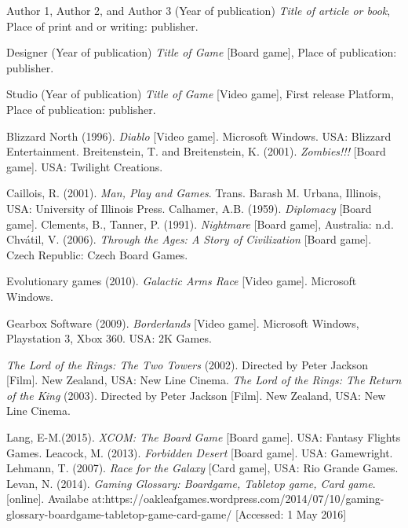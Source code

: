 \documentclass[a4paper,11pt]{article}
\begin{document}
\pagebreak
%
\begin{thebibliography}{1}

Author 1, Author 2, and Author 3 (Year of publication) \emph{Title of article or book}, Place of print and or writing: publisher.

Designer (Year of publication) \emph{Title of Game} [Board game], Place of publication: publisher.

Studio (Year of publication) \emph{Title of Game} [Video game],  First release Platform, Place of publication: publisher.


Blizzard North (1996). \textit{Diablo} [Video game]. Microsoft Windows. USA: Blizzard Entertainment.
Breitenstein, T. and Breitenstein, K. (2001). \textit{Zombies!!!} [Board game]. USA: Twilight Creations.

Caillois, R. (2001). \textit{Man, Play and Games}. Trans. Barash M. Urbana, Illinois, USA: University of Illinois Press.
Calhamer, A.B. (1959). \textit{Diplomacy} [Board game].
Clements, B., Tanner, P. (1991). \textit{Nightmare} [Board game], Australia: n.d.
Chvátil, V. (2006). \textit{Through the Ages: A Story of Civilization} [Board game]. Czech Republic: Czech Board Games.

Evolutionary games (2010). \textit{Galactic Arms Race} [Video game]. Microsoft Windows. 


Gearbox Software (2009). \textit{Borderlands} [Video game]. Microsoft Windows, Playstation 3, Xbox 360. USA: 2K Games.

\textit{The Lord of the Rings: The Two Towers} (2002). Directed by Peter Jackson [Film]. New Zealand, USA: New Line Cinema.
\textit{The Lord of the Rings: The Return of the King} (2003). Directed by Peter Jackson [Film]. New Zealand, USA: New Line Cinema.

Lang, E-M.(2015). \textit{XCOM: The Board Game} [Board game]. USA: Fantasy Flights Games.
Leacock, M. (2013). \textit{Forbidden Desert} [Board game]. USA: Gamewright.
Lehmann, T. (2007). \textit{Race for the Galaxy} [Card game], USA: Rio Grande Games.
Levan, N. (2014). \textit{Gaming Glossary: Boardgame, Tabletop game, Card game}. [online]. Availabe at:https://oakleafgames.wordpress.com/2014/07/10/gaming-glossary-boardgame-tabletop-game-card-game/ [Accessed: 1 May 2016]


\end{thebibliography}
\end{document}
